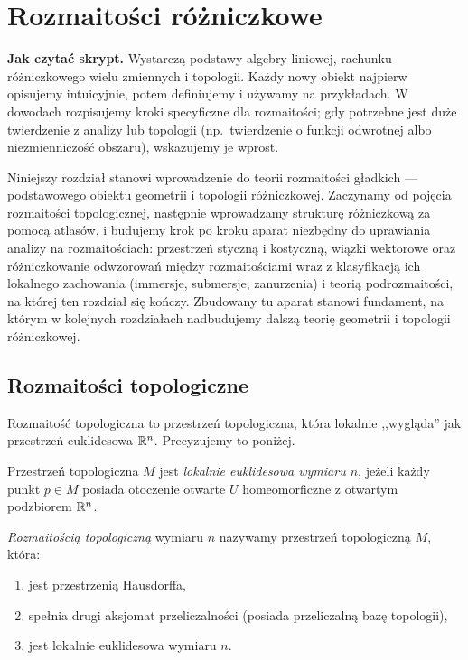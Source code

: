 \chapter{Rozmaitości różniczkowe}
\label{ch:rozmaitosci}

\noindent\textbf{Jak czytać skrypt.}
Wystarczą podstawy algebry liniowej, rachunku różniczkowego
wielu zmiennych i topologii. Każdy nowy obiekt najpierw
opisujemy intuicyjnie, potem definiujemy i używamy na
przykładach. W dowodach rozpisujemy kroki specyficzne dla
rozmaitości; gdy potrzebne jest duże twierdzenie z analizy
lub topologii (np.\ twierdzenie o funkcji odwrotnej albo
niezmienniczość obszaru), wskazujemy je wprost.

Niniejszy rozdział stanowi wprowadzenie do teorii rozmaitości gładkich — podstawowego
obiektu geometrii i topologii różniczkowej. Zaczynamy od pojęcia rozmaitości topologicznej,
następnie wprowadzamy strukturę różniczkową za pomocą atlasów, i budujemy krok po kroku
aparat niezbędny do uprawiania analizy na rozmaitościach: przestrzeń styczną i kostyczną,
wiązki wektorowe oraz różniczkowanie odwzorowań między rozmaitościami wraz z klasyfikacją
ich lokalnego zachowania (immersje, submersje, zanurzenia) i teorią podrozmaitości, na
której ten rozdział się kończy. Zbudowany tu aparat stanowi fundament, na którym w
kolejnych rozdziałach nadbudujemy dalszą teorię geometrii i topologii różniczkowej.



\section{Rozmaitości topologiczne}

Rozmaitość topologiczna to przestrzeń topologiczna, która lokalnie ,,wygląda'' jak
przestrzeń euklidesowa $\mathbb{R}^n$. Precyzujemy to poniżej.

\begin{definicja}
Przestrzeń topologiczna $M$ jest \emph{lokalnie euklidesowa wymiaru $n$}, jeżeli każdy
punkt $p\in M$ posiada otoczenie otwarte $U$ homeomorficzne z otwartym podzbiorem $\mathbb{R}^n$.
\end{definicja}

\begin{definicja}
\emph{Rozmaitością topologiczną} wymiaru $n$ nazywamy przestrzeń topologiczną $M$, która:
\begin{enumerate}[label=(\roman*)]
\item jest przestrzenią Hausdorffa,
\item spełnia drugi aksjomat przeliczalności (posiada przeliczalną bazę topologii),
\item jest lokalnie euklidesowa wymiaru $n$.
\end{enumerate}
\end{definicja}

